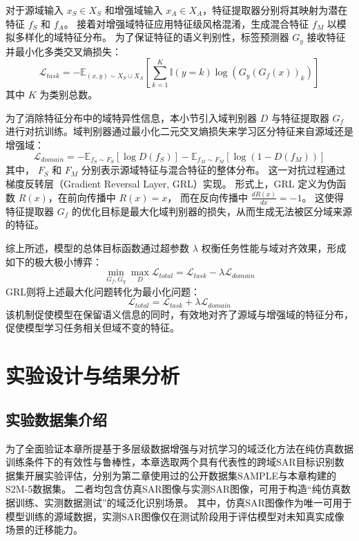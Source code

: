 对于源域输入 $x_S \in X_S$ 和增强域输入 $x_A \in X_A$，特征提取器分别将其映射为潜在特征 $f_S$ 和 $f_A$。
接着对增强域特征应用特征级风格混淆，生成混合特征 $f_M$ 以模拟多样化的域特征分布。
为了保证特征的语义判别性，标签预测器 $G_y$ 接收特征并最小化多类交叉熵损失：
\begin{equation}
\mathcal{L}_{task} = -\mathbb{E}_{(x,y) \sim X_S \cup X_A} \left[ \sum_{k=1}^{K} \mathbb{I}(y=k) \log(G_y(G_f(x))_k) \right]
\end{equation}
其中 $K$ 为类别总数。

为了消除特征分布中的域特异性信息，本小节引入域判别器 $D$ 与特征提取器 $G_f$ 进行对抗训练。域判别器通过最小化二元交叉熵损失来学习区分特征来自源域还是增强域：
\begin{equation}
\mathcal{L}_{domain} = -\mathbb{E}_{f_S \sim F_S} \left[ \log D(f_S) \right] - \mathbb{E}_{f_M \sim F_M} \left[ \log(1-D(f_M)) \right]
\end{equation}
其中， $F_S$ 和 $F_M$ 分别表示源域特征与混合特征的整体分布。
这一对抗过程通过梯度反转层（Gradient Reversal Layer, GRL）实现。
形式上，GRL 定义为伪函数 $R(x)$，在前向传播中 $R(x)=x$，
而在反向传播中 $\frac{d R(x)}{d x} = -1$。
这使得特征提取器 $G_f$ 的优化目标是最大化域判别器的损失，从而生成无法被区分域来源的特征。

综上所述，模型的总体目标函数通过超参数 $\lambda$ 权衡任务性能与域对齐效果，形成如下的极大极小博弈：
\begin{equation}
\min_{G_f, G_y} \max_{D} \mathcal{L}_{total} = \mathcal{L}_{task} - \lambda \mathcal{L}_{domain}
\end{equation}
GRL则将上述最大化问题转化为最小化问题：
\begin{equation}
\mathcal{L}_{total} = \mathcal{L}_{task} + \lambda \mathcal{L}_{domain}
\end{equation}
该机制促使模型在保留语义信息的同时，有效地对齐了源域与增强域的特征分布，促使模型学习任务相关但域不变的特征。

\section{实验设计与结果分析}

\subsection{实验数据集介绍}
为了全面验证本章所提基于多层级数据增强与对抗学习的域泛化方法在纯仿真数据训练条件下的有效性与鲁棒性，本章选取两个具有代表性的跨域SAR目标识别数据集开展实验评估，分别为第二章使用过的公开数据集SAMPLE与本章构建的S2M-5数据集。
二者均包含仿真SAR图像与实测SAR图像，可用于构造“纯仿真数据训练、实测数据测试”的域泛化识别场景。
其中，仿真SAR图像作为唯一可用于模型训练的源域数据，实测SAR图像仅在测试阶段用于评估模型对未知真实成像场景的迁移能力。

